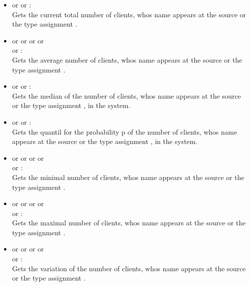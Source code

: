 \begin{itemize}

\item
{} or  or :\\
Gets the current total number of clients, whos name appears at the source or the type assignment .

\item
{} or  or  or  or\\
 or :\\
Gets the average number of clients, whos name appears at the source or the type assignment .

\item
{} or  or :\\
Gets the median of the number of clients, whos name appears at the source or the type assignment , in the system.

\item
{} or  or :\\
Gets the quantil for the probability p of the number of clients, whos name appears at the source or the type assignment , in the system.

\item
{} or  or  or  or\\
 or :\\
Gets the minimal number of clients, whos name appears at the source or the type assignment .

\item
{} or  or  or  or\\
 or :\\
Gets the maximal number of clients, whos name appears at the source or the type assignment .

\item
{} or  or  or  or\\
 or :\\
Gets the variation of the number of clients, whos name appears at the source or the type assignment .


\end{itemize}

